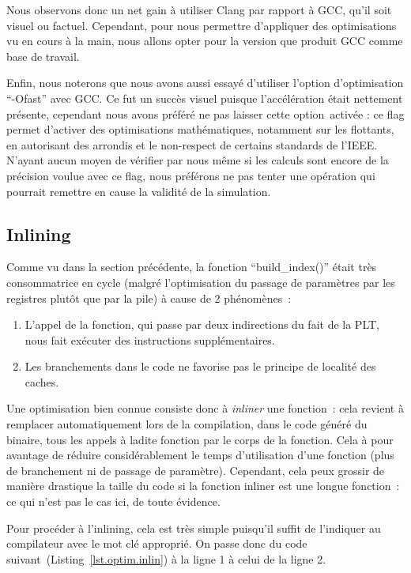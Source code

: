 \documentclass[12pt,a4paper]{article}
\begin{document}
Nous observons donc un net gain à utiliser Clang par rapport à \ac{GCC}, qu'il
soit visuel ou factuel. Cependant, pour nous permettre d'appliquer des
optimisations vu en cours à la main, nous allons opter pour la version que
produit \ac{GCC} comme base de travail.

Enfin, nous noterons que nous avons aussi essayé d'utiliser l'option
d'optimisation \enquote{-Ofast} avec \ac{GCC}. Ce fut un succès visuel puisque
l'accélération était nettement présente, cependant nous avons préféré ne pas
laisser cette option activée : ce flag permet d'activer des optimisations
mathématiques, notamment sur les flottants, en autorisant des arrondis et le
non-respect de certains standards de l'\ac{IEEE}. N'ayant aucun moyen de vérifier par
nous même si les calculs sont encore de la précision voulue avec ce flag, nous
préférons ne pas tenter une opération qui pourrait remettre en cause la validité
de la simulation.

\subsection{Inlining}
\label{sub.optim.inlin}

Comme vu dans la section précédente, la fonction \enquote{build\_index()} était
très consommatrice en cycle (malgré l'optimisation du passage de paramètres par
les registres plutôt que par la pile) à cause de 2 phénomènes :
\begin{enumerate}
    \item L'appel de la fonction, qui passe par deux indirections du fait de la
        \ac{PLT}, nous fait exécuter des instructions supplémentaires.
    \item Les branchements dans le code ne favorise pas le principe de localité
        des caches.
\end{enumerate}

Une optimisation bien connue consiste donc à \textit{inliner} une fonction :
cela revient à remplacer automatiquement lors de la compilation, dans le code
généré du binaire, tous les appels à ladite fonction par le corps de la
fonction. Cela à pour avantage de réduire considérablement le temps
d'utilisation d'une fonction (plus de branchement ni de passage de paramètre).
Cependant, cela peux grossir de manière drastique la taille du code si la
fonction inliner est une longue fonction : ce qui n'est pas le cas ici, de toute
évidence.

Pour procéder à l'inlining, cela est très simple puisqu'il suffit de l'indiquer
au compilateur avec le mot clé approprié. On passe donc du code
suivant (Listing~\ref{lst.optim.inlin}) à la ligne 1 à celui de la ligne 2.
\end{document}
